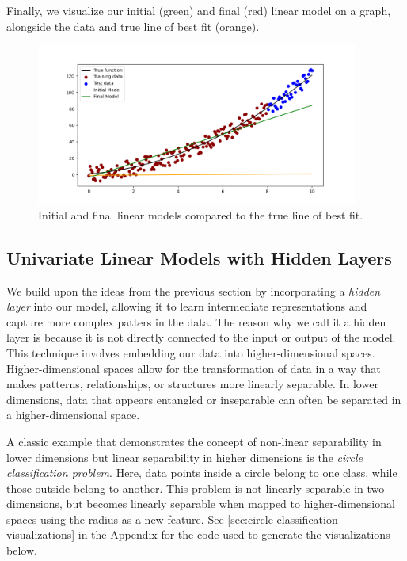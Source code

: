 Finally, we visualize our initial (green) and final (red) linear model on a graph, alongside the data and true line of best fit (orange). 

\begin{figure}[H]
\centering
\includegraphics[width=300pt]{Regression/code/final-model.png}
\caption{Initial and final linear models compared to the true line of best fit.}
\label{fig:linear6}
\end{figure}

\subsection{Univariate Linear Models with Hidden Layers}
We build upon the ideas from the previous section by incorporating a \emph{hidden layer} into our model, allowing it to learn intermediate representations and capture more complex patters in the data. The reason why we call it a hidden layer is because it is not directly connected to the input or output of the model. This technique involves embedding our data into higher-dimensional spaces. Higher-dimensional spaces allow for the transformation of data in a way that makes patterns, relationships, or structures more linearly separable. In lower dimensions, data that appears entangled or inseparable can often be separated in a higher-dimensional space. 

A classic example that demonstrates the concept of non-linear separability in lower dimensions but linear separability in higher dimensions is the \emph{circle classification problem}. Here, data points inside a circle belong to one class, while those outside belong to another. This problem is not linearly separable in two dimensions, but becomes linearly separable when mapped to higher-dimensional spaces using the radius as a new feature. See \ref{sec:circle-classification-visualizations} in the Appendix for the code used to generate the visualizations below.

